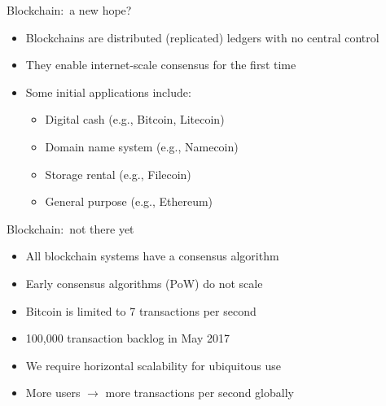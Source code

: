 \documentclass{beamer}
\begin{document}
\begin{frame}{Blockchain:~a new hope?}
  \begin{itemize}
    \item Blockchains are distributed (replicated) ledgers with no central control
    \item They enable internet-scale consensus for the first time
    \item Some initial applications include:
    \begin{itemize}
      \item Digital cash (e.g., Bitcoin, Litecoin)
      \item Domain name system (e.g., Namecoin)
      \item Storage rental (e.g., Filecoin)
      \item General purpose (e.g., Ethereum)
    \end{itemize}
  \end{itemize}
\end{frame}

\begin{frame}{Blockchain:~not there yet}
  \begin{itemize}
    \item All blockchain systems have a consensus algorithm
    \item Early consensus algorithms (PoW) do not scale
    \item Bitcoin is limited to 7 transactions per second
    \item 100,000 transaction backlog in May 2017
    \item We require horizontal scalability for ubiquitous use
    \item More users $\rightarrow$ more transactions per second globally
  \end{itemize}
\end{frame}
\end{document}

